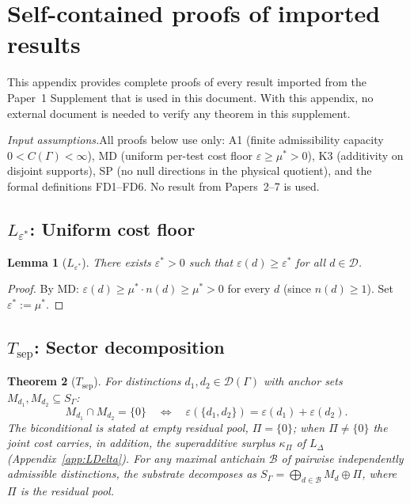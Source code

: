 \documentclass[11pt]{article}
\newtheorem{theorem_app}{Theorem}[section]
\newtheorem{lemma_app}[theorem_app]{Lemma}
\theoremstyle{definition}
\begin{document}
\section{Self-contained proofs of imported results}
\label{app:imported}

This appendix provides complete proofs of every result imported from the
Paper~1 Supplement that is used in this document.  With this appendix,
no external document is needed to verify any theorem in this supplement.

\smallskip\noindent\textit{Input assumptions.}\quad All proofs below
use only: A1 (finite admissibility capacity $0 < C(\Gamma) < \infty$),
MD (uniform per-test cost floor $\varepsilon \ge \mu^* > 0$),
K3 (additivity on disjoint supports), SP (no null directions in the
physical quotient), and the formal definitions FD1--FD6.  No result
from Papers~2--7 is used.


\subsection{$L_{\varepsilon^*}$: Uniform cost floor}
\label{app:Leps}

\begin{lemma_app}[$L_{\varepsilon^*}$]
There exists $\varepsilon^* > 0$ such that
$\varepsilon(d) \ge \varepsilon^*$ for all $d \in \mathcal{D}$.
\end{lemma_app}

\begin{proof}
By MD: $\varepsilon(d) \ge \mu^* \cdot n(d) \ge \mu^* > 0$ for every
$d$ (since $n(d) \ge 1$).  Set $\varepsilon^* := \mu^*$.
\end{proof}


\subsection{$T_{\mathrm{sep}}$: Sector decomposition}
\label{app:Tsep}

\begin{theorem_app}[$T_{\mathrm{sep}}$]
For distinctions $d_1, d_2 \in \mathcal{D}(\Gamma)$ with anchor sets
$M_{d_1}, M_{d_2} \subseteq S_\Gamma$:
\[
  M_{d_1} \cap M_{d_2} = \{0\}
  \quad\Longleftrightarrow\quad
  \varepsilon(\{d_1, d_2\}) = \varepsilon(d_1) + \varepsilon(d_2).
\]
The biconditional is stated at empty residual pool, $\Pi = \{0\}$; when
$\Pi \neq \{0\}$ the joint cost carries, in addition, the superadditive
surplus $\kappa_\Pi$ of $L_\Delta$ (Appendix~\ref{app:LDelta}).
For any maximal antichain $\mathcal{B}$ of pairwise independently
admissible distinctions, the substrate decomposes as
$S_\Gamma = \bigoplus_{d \in \mathcal{B}} M_d \oplus \Pi$,
where $\Pi$ is the residual pool.
\end{theorem_app}
\end{document}
